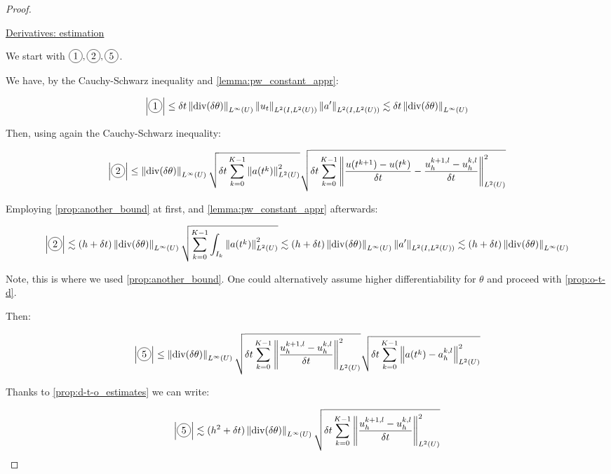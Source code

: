 \documentclass[english,a4paper,9pt,oneside]{scrbook}	%
\theoremstyle{break}
\newenvironment{mproof}[1][\proofname]{%
  \begin{proof}[#1]$ $\par\nobreak\ignorespaces
}{%
  \end{proof}
}
\renewcommand*{\proofname}{Proof}
\theoremstyle{remark}
\newcommand{\norm}[1]{\left\lVert#1\right\rVert}
\newcommand{\te}{\theta}
\newcommand{\dive}{\text{div}}
\newcommand*\circled[1]{\tikz[baseline=(char.base)]{
            \node[shape=circle,draw,inner sep=2pt] (char) {#1};}}
\begin{document}
\begin{mproof}
\underline{Derivatives: estimation}

We start with $\circled{1},\circled{2},\circled{5}$.

We have, by the Cauchy-Schwarz inequality and \cref{lemma:pw_constant_appr}:

\begin{align*}
\left |\circled{1}\right|\leq \delta t \norm{\dive(\delta \te)}_{L^\infty(U)}\norm{u_t}_{L^2(I,L^2(U))}\norm{a'}_{L^2(I,L^2(U))}\lesssim \delta t \norm{\dive(\delta \te)}_{L^\infty(U)}
\end{align*}

Then, using again the Cauchy-Schwarz inequality:

\begin{align*}
\left |\circled{2}\right|\leq \norm{\dive(\delta \te)}_{L^\infty(U)} \sqrt{\delta t \sum_{k=0}^{K-1} \norm{a(t^k)}^2_{L^2(U)}}\sqrt{\delta t \sum_{k=0}^{K-1} \norm{\frac{u(t^{k+1})-u(t^k)}{\delta t} - \frac{u_h^{k+1,l}-u_h^{k, l}}{\delta t}}_{L^2(U)}^2}
\end{align*}

Employing \cref{prop:another_bound} at first, and \cref{lemma:pw_constant_appr} afterwards:

\begin{align*}
\left |\circled{2}\right|\lesssim (h+\delta t) \norm{\dive(\delta \te)}_{L^\infty(U)} \sqrt{\sum_{k=0}^{K-1} \int_{I_k}\norm{a(t^k)}^2_{L^2(U)}}\lesssim (h+\delta t) \norm{\dive(\delta \te)}_{L^\infty(U)} \norm{a'}_{L^2(I,L^2(U))}\lesssim  (h+\delta t) \norm{\dive(\delta \te)}_{L^\infty(U)}
\end{align*}

Note, this is where we used \cref{prop:another_bound}. One could alternatively assume higher differentiability for $\theta$ and proceed with \cref{prop:o-t-d}.

Then:

\begin{align*}
	\left |\circled{5}\right|\leq  \norm{\dive(\delta \te)}_{L^\infty(U)} \sqrt{\delta t\sum_{k=0}^{K-1} \norm{\frac{u_h^{k+1,l}-u_h^{k, l}}{\delta t}}_{L^2(U)}^2}\sqrt{\delta t\sum_{k=0}^{K-1} \norm{a(t^{k})-a_h^{k,l}}_{L^2(U)}^2}
\end{align*}

Thanks to \cref{prop:d-t-o_estimates} we can write:

\begin{align*}
	\left |\circled{5}\right|\lesssim (h^2+\delta t)  \norm{\dive(\delta \te)}_{L^\infty(U)} \sqrt{\delta t\sum_{k=0}^{K-1} \norm{\frac{u_h^{k+1,l}-u_h^{k, l}}{\delta t}}_{L^2(U)}^2}
\end{align*}


\end{mproof}
\end{document}
